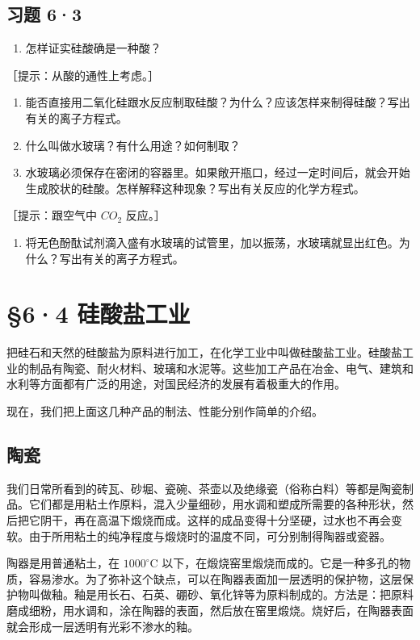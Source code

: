 \subsection{习题 6·3}

\begin{enumerate}
\item
  怎样证实硅酸确是一种酸？
\end{enumerate}

［提示：从酸的通性上考虑。］

\begin{enumerate}[start=2]
\item
  能否直接用二氧化硅跟水反应制取硅酸？为什么？应该怎样来制得硅酸？写出有关的离子方程式。
\item
  什么叫做水玻璃？有什么用途？如何制取？
\item
  水玻璃必须保存在密闭的容器里。如果敞开瓶口，经过一定时间后，就会开始生成胶状的硅酸。怎样解释这种现象？写出有关反应的化学方程式。
\end{enumerate}

［提示：跟空气中 \(CO_{2}\) 反应。］

\begin{enumerate}[start=5]
\item
  将无色酚酞试剂滴入盛有水玻璃的试管里，加以振荡，水玻璃就显出红色。为什么？写出有关的离子方程式。
\end{enumerate}

\section{§6·4 硅酸盐工业}

把硅石和天然的硅酸盐为原料进行加工，在化学工业中叫做硅酸盐工业。硅酸盐工业的制品有陶瓷、耐火材料、玻璃和水泥等。这些加工产品在冶金、电气、建筑和水利等方面都有广泛的用途，对国民经济的发展有着极重大的作用。

现在，我们把上面这几种产品的制法、性能分别作简单的介绍。

\subsection{陶瓷}

我们日常所看到的砖瓦、砂堀、瓷碗、茶壶以及绝缘瓷（俗称白料）等都是陶瓷制品。它们都是用粘土作原料，混入少量细砂，用水调和塑成所需要的各种形状，然后把它阴干，再在高温下煅烧而成。这样的成品变得十分坚硬，过水也不再会变软。由于所用粘土的纯净程度与煅烧时的温度不同，可分别制得陶器或瓷器。

陶器是用普通粘土，在 \(1000^{\circ}\mathrm{C}\)
以下，在煅烧窑里煅烧而成的。它是一种多孔的物质，容易渗水。为了弥补这个缺点，可以在陶器表面加一层透明的保护物，这层保护物叫做釉。釉是用长石、石英、硼砂、氧化锌等为原料制成的。方法是：把原料磨成细粉，用水调和，涂在陶器的表面，然后放在窑里煅烧。烧好后，在陶器表面就会形成一层透明有光彩不渗水的釉。

